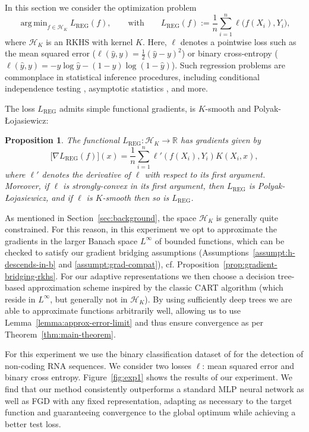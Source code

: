\documentclass{article}
\newtheorem{proposition}[theorem]{Proposition}
\newcommand{\R}{\mathbb{R}}
\DeclareMathOperator*{\argmin}{arg\,min}
\renewcommand{\H}{\mathcal{H}}
\begin{document}
In this section we consider the optimization problem
\begin{equation}
    \argmin_{f \in \H_K} L_\mathrm{REG}(f), \qquad\text{with}\qquad L_\mathrm{REG}(f) := \frac{1}{n} \sum_{i=1}^n \ell\bigl( f(X_i), Y_i \bigr),
\end{equation}
where $\H_K$ is an RKHS with kernel $K$.
Here, $\ell$ denotes a pointwise loss such as the mean squared error ($\ell(\hat{y}, y) = \frac{1}{2} (\hat{y} - y)^2$) or binary cross-entropy ($\ell(\hat{y}, y) = -y \log \hat{y} - (1-y) \log (1-\hat{y})$).
Such regression problems are commonplace in statistical inference procedures, including conditional independence testing \citep{kernel-ci-test}, asymptotic statistics \citep{van-der-vaart}, and more.

The loss $L_\mathrm{REG}$ admits simple functional gradients, is $K$-smooth and Polyak-Łojasiewicz:

\begin{proposition}\label{prop:gradient-kernel}
    The functional $L_\mathrm{REG} : \mathcal{H}_K \to \R$ has gradients given by
    \[ \bigl[ \nabla L_\mathrm{REG}(f) \bigr](x) = \frac{1}{n} \sum_{i=1}^n \ell'(f(X_i), Y_i) K(X_i, x), \]
    where $\ell'$ denotes the derivative of $\ell$ with respect to its first argument.
    Moreover, if $\ell$ is strongly-convex in its first argument, then $L_\mathrm{REG}$ is Polyak-Łojasiewicz, and if $\ell$ is $K$-smooth then so is $L_\mathrm{REG}$.
\end{proposition}

As mentioned in Section~\ref{sec:background}, the space $\H_K$ is generally quite constrained.
For this reason, in this experiment we opt to approximate the gradients in the larger Banach space $L^\infty$ of bounded functions, which can be checked to satisfy our gradient bridging assumptions (Assumptions~\ref{assumpt:h-descends-in-b} and \ref{assumpt:grad-compat}), cf. Proposition~\ref{prop:gradient-bridging-rkhs}.
For our adaptive representations we then choose a decision tree-based approximation scheme inspired by the classic CART algorithm (which reside in $L^\infty$, but generally not in $\H_K$).
By using sufficiently deep trees we are able to approximate functions arbitrarily well, allowing us to use Lemma~\ref{lemma:approx-error-limit} and thus ensure convergence as per Theorem~\ref{thm:main-theorem}.

For this experiment we use the binary classification dataset of \citep{libsvm-data} for the detection of non-coding RNA sequences.
We consider two losses $\ell$: mean squared error and binary cross entropy.
Figure~\ref{fig:exp1} shows the results of our experiment.
We find that our method consistently outperforms a standard MLP neural network as well as FGD with any fixed representation, adapting as necessary to the target function and guaranteeing convergence to the global optimum while achieving a better test loss.
\end{document}
